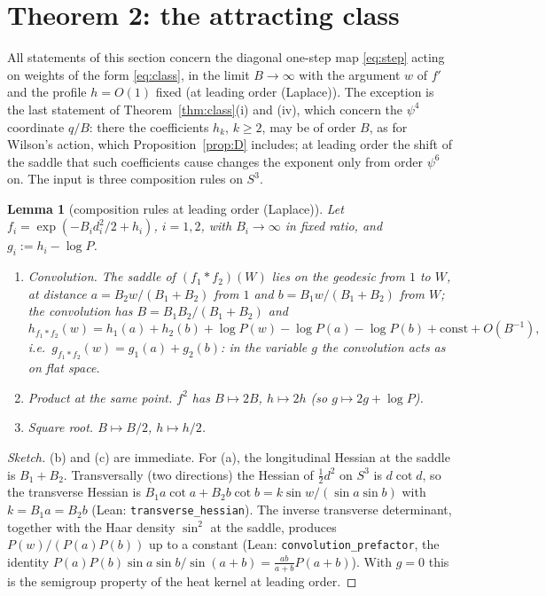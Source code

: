 \documentclass[11pt,a4paper]{article}
\newtheorem{lemma}{Lemma}[section]
\theoremstyle{definition}
\theoremstyle{remark}
\newcommand{\code}[1]{\texttt{#1}}
\begin{document}
\section{Theorem 2: the attracting class}\label{sec:thm2}

All statements of this section concern the diagonal one-step map \eqref{eq:step} acting on weights of the form \eqref{eq:class}, in the limit $B\to\infty$ with the argument $w$ of $f'$ and the profile $h=O(1)$ fixed (at leading order (Laplace)). The exception is the last statement of Theorem~\ref{thm:class}(i) and (iv), which concern the $\psi^4$ coordinate $q/B$: there the coefficients $h_k$, $k\ge2$, may be of order $B$, as for Wilson's action, which Proposition~\ref{prop:D} includes; at leading order the shift of the saddle that such coefficients cause changes the exponent only from order $\psi^6$ on.
The input is three composition rules on $S^3$.

\begin{lemma}[composition rules at leading order (Laplace)]\label{lem:rules}
Let $f_i=\exp(-B_id_i^2/2+h_i)$, $i=1,2$, with $B_i\to\infty$ in fixed ratio, and $g_i:=h_i-\log P$.
\begin{enumerate}[label=(\alph*)]
\item \emph{Convolution.} The saddle of $(f_1*f_2)(W)$ lies on the geodesic from $1$ to $W$, at distance $a=B_2w/(B_1+B_2)$ from $1$ and $b=B_1w/(B_1+B_2)$ from $W$; the convolution has $B=B_1B_2/(B_1+B_2)$ and
\[
h_{f_1*f_2}(w)=h_1(a)+h_2(b)+\log P(w)-\log P(a)-\log P(b)+\mathrm{const}+O(B^{-1}),
\]
i.e.\ $g_{f_1*f_2}(w)=g_1(a)+g_2(b)$: in the variable $g$ the convolution acts as on flat space.
\item \emph{Product at the same point.} $f^2$ has $B\mapsto2B$, $h\mapsto2h$ (so $g\mapsto2g+\log P$).
\item \emph{Square root.} $B\mapsto B/2$, $h\mapsto h/2$.
\end{enumerate}
\end{lemma}

\begin{proof}[Sketch]
(b) and (c) are immediate.
For (a), the longitudinal Hessian at the saddle is $B_1+B_2$.
Transversally (two directions) the Hessian of $\tfrac12d^2$ on $S^3$ is $d\cot d$, so the transverse Hessian is $B_1a\cot a+B_2b\cot b=k\sin w/(\sin a\sin b)$ with $k=B_1a=B_2b$ (Lean: \code{transverse\_hessian}).
The inverse transverse determinant, together with the Haar density $\sin^2$ at the saddle, produces $P(w)/(P(a)P(b))$ up to a constant (Lean: \code{convolution\_prefactor}, the identity $P(a)P(b)\sin a\sin b/\sin(a+b)=\frac{ab}{a+b}P(a+b)$).
With $g=0$ this is the semigroup property of the heat kernel at leading order.
\end{proof}
\end{document}
